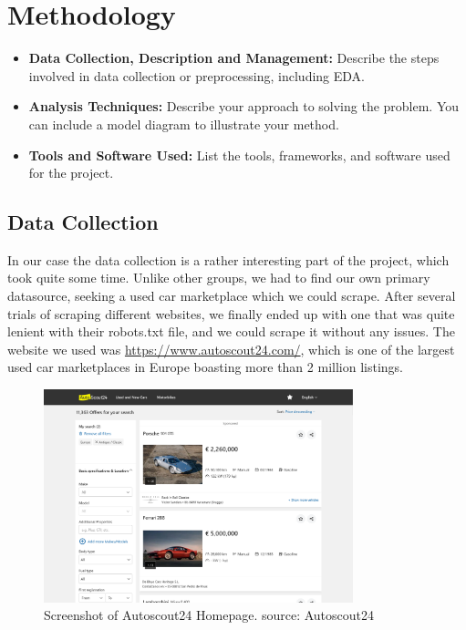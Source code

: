 \documentclass[12pt]{article}
\begin{document}
\section{Methodology}

\begin{itemize}
    \item \textbf{Data Collection, Description and Management:} Describe the steps involved in data collection or preprocessing, including EDA.
    \item \textbf{Analysis Techniques:} Describe your approach to solving the problem. You can include a model diagram to illustrate your method.
    \item \textbf{Tools and Software Used:} List the tools, frameworks, and software used for the project.
\end{itemize}

\subsection{Data Collection}

In our case the data collection is a rather interesting part of the project, which took quite some time. Unlike other groups, we had to find our own primary datasource, seeking a used car marketplace which we could scrape.
After several trials of scraping different websites, we finally ended up with one that was quite lenient with their robots.txt file, and we could scrape it without any issues. The website we used was \url{https://www.autoscout24.com/}, which is one of the largest used car marketplaces in Europe boasting more than 2 million listings.

\begin{figure}[ht]
  \centering
  \includegraphics[width=0.8\textwidth]{./images/autoscout.png}
  \caption{Screenshot of Autoscout24 Homepage. source: Autoscout24}
  \label{fig:autoscout}
\end{figure}
\end{document}
